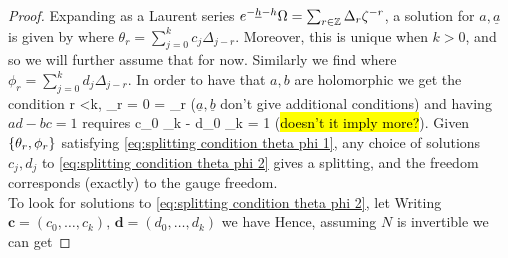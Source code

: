 \documentclass{article}
\begin{document}
\begin{proof}
{}
Expanding as a Laurent series $e^{-\underline{h}-h}\Omega = \sum_{r \in \mathbb{Z}} \Delta_r \zeta^{-r}$, a solution for $a,\underline{a}$ is given by 
where $\theta_r = \sum_{j=0}^k c_j \Delta_{j-r}$. Moreover, this is unique when $k>0$, and so we will further assume that for now. Similarly we find 
where $\phi_r = \sum_{j=0}^k d_j \Delta_{j-r}$. In order to have that $a,b$ are holomorphic we get the condition 
\be\label{eq:splitting condition theta phi 1}
 \leq r <k, \; \theta_r = 0 = \phi_r
\ee
($\underline{a}, \underline{b}$ don't give additional conditions) and having $ad-bc=1$ requires 
\be\label{eq:splitting condition theta phi 2}
c_0 \phi_k - d_0 \theta_k = 1
\ee
(\hl{doesn't it imply more?}). Given $\left\{ \theta_r,\phi_r \right\}$ satisfying \ref{eq:splitting condition theta phi 1}, any choice of solutions $c_j,d_j$ to  \ref{eq:splitting condition theta phi 2} gives a splitting, and the freedom corresponds (exactly) to the gauge freedom. \\
To look for solutions to \ref{eq:splitting condition theta phi 2}, let 
Writing $\bm{c} = (c_0, \dots, c_k), \, \bm{d} = (d_0, \dots, d_k)$ we have 
Hence, assuming $N$ is invertible we can get 
\end{proof}
\end{document}
